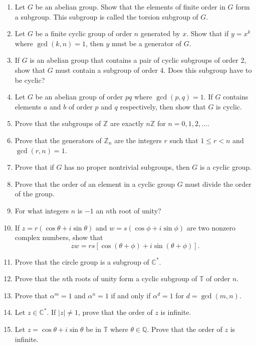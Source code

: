 {\begin{enumerate}
 
\item
Let $G$ be an abelian group. Show that the elements of finite order in
$G$ form a subgroup. This subgroup is called the {\bfi torsion
subgroup} of $G$. 
 
 
\item
Let $G$ be a finite cyclic group of order $n$ generated by $x$. Show
that if $y = x^k$ where $\gcd(k,n) = 1$, then $y$ must be a generator
of $G$.
 
 
\item
If $G$ is an abelian group that contains a pair of cyclic subgroups of
order 2, show that $G$ must contain a subgroup of order 4. Does this
subgroup have to be cyclic?
 
 
\item
Let $G$ be an abelian group of order $pq$ where $\gcd(p,q) = 1$.  If
$G$ contains elements $a$ and $b$ of order $p$ and $q$ respectively,
then show that $G$ is cyclic. 
 
 
\item
Prove that the subgroups of ${\mathbb Z}$ are exactly $n{\mathbb Z}$ for $n
= 0, 1, 2, \ldots$. 
 
 
\item
Prove that the generators of ${\mathbb Z}_n$ are the integers $r$ such
that $1 \leq r < n$ and $\gcd(r,n) =  1$. 
 
 
\item
Prove that if $G$ has no proper nontrivial subgroups, then $G$ is a 
cyclic group.
 
 
 
\item
Prove that the order of an element in a cyclic group $G$ must divide
the order of the  group. 
 
 
\item
For what integers $n$ is $-1$ an $n$th root of unity?
 
 
\item
If $z = r( \cos \theta + i \sin \theta)$ and $w = s(\cos \phi + i \sin
\phi)$ are two nonzero complex numbers, show that
\[
zw = rs[ \cos( \theta + \phi)  + i \sin( \theta + \phi)].
\]
 
 
\item
Prove that the circle group is a subgroup of  ${\mathbb C}^*$.
 
 
\item
Prove that the $n$th roots of unity form a cyclic subgroup of ${\mathbb
T}$  of order $n$. 
 
 
\item
Prove that $\alpha^m =1$ and $\alpha^n = 1$ if and only if $\alpha^d = 1$
for $d = \gcd(m,n)$.
 
 
\item
Let $z \in {\mathbb C}^\ast$. If $|z| \neq 1$, prove that the order of
$z$ is infinite. 
 
 
\item
Let $z =\cos \theta + i \sin \theta$ be in ${\mathbb T}$ where $\theta
\in {\mathbb Q}$.  Prove that the order of $z$ is infinite.
 
\end{enumerate}
}
 
